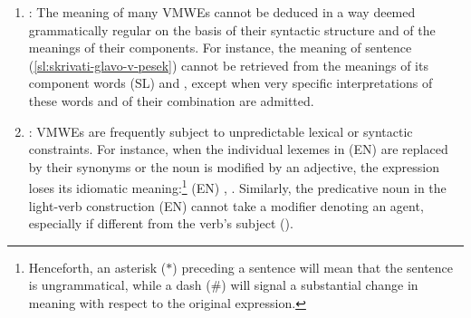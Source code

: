 \documentclass[output=paper,modfonts]{langscibook}
\begin{document}
\begin{enumerate}
\item\label{prop:noncomp} : 
The meaning of many VMWEs cannot be deduced in a way deemed grammatically regular on the basis of their syntactic structure and of the meanings of their components. For instance, the meaning of sentence (\ref{sl:skrivati-glavo-v-pesek}) cannot be retrieved from the meanings of its component words (SL)  and , except when very specific interpretations of these words and of their combination are admitted.
\item\label{prop:constraints} : VMWEs are frequently subject to unpredictable lexical or syntactic constraints. For instance, when the individual lexemes in (EN)  are replaced by their synonyms or the noun is modified by an adjective, the expression loses its idiomatic meaning:\footnote{Henceforth, an asterisk ($\ast$) preceding a sentence will mean that the sentence is ungrammatical, while a dash (\#) will signal a substantial change in meaning with respect to the original expression.}  (EN) , . Similarly, the predicative noun in the light-verb construction (EN)  cannot take a modifier denoting an agent, especially if different from the verb's subject ().



\end{enumerate}
\end{document}
